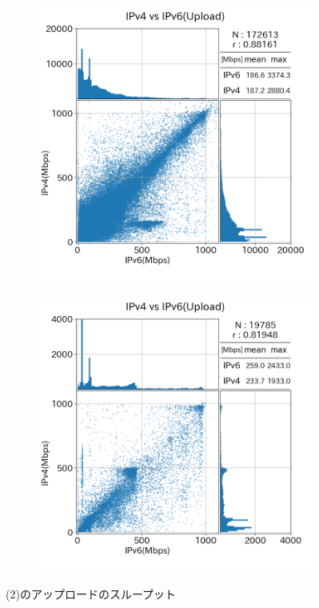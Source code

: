 \begin{figure}[htbp]
\begin{center}
        \begin{subfigure}[b]{0.49\textwidth}
            \centering
            \includegraphics[width=1.0\textwidth]{fig/new_sameISP_ul.png}
            \label{new_sameISP_ul}
        \end{subfigure}
        \begin{subfigure}[b]{0.49\textwidth}
            \centering
            \includegraphics[width=1.0\textwidth]{fig/new_diffISP_ul.png}
            \label{new_diffISP_ul}
        \end{subfigure}
        \caption{(2)のアップロードのスループット}
        \label{fig:new_isp_ul}
    \end{center}
\end{figure}
\FloatBarrier


